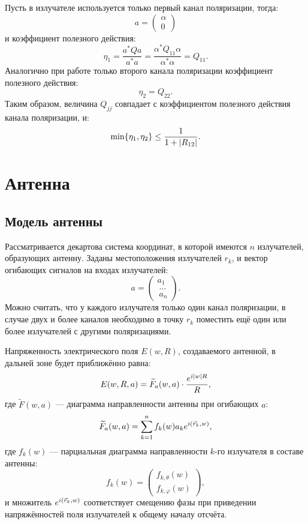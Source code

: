 Пусть в излучателе используется только первый канал поляризации, тогда:
\[
    a
    = \begin{pmatrix}
          \alpha \\
          0
    \end{pmatrix}
\]
и коэффициент полезного действия:
\[
    \eta_1
    = \frac{a^* Q a}{a^* a}
    = \frac{\alpha^* Q_{11} \alpha}{\alpha^* \alpha}
    = Q_{11}.
\]
Аналогично при работе только второго канала поляризации коэффициент полезного действия:
\[
    \eta_2 = Q_{22} .
\]
Таким образом, величина $Q_{jj}$ совпадает с коэффициентом полезного действия канала поляризации, и:
\[
    \min \{ \eta_1, \eta_2 \} \le \frac{1}{1 + \left | R_{12} \right |} .
\]


\section{Антенна}

\subsection{Модель антенны}

Рассматривается декартова система координат, в которой имеются $n$ излучателей, образующих антенну. Заданы местоположения излучателей $r_k$, и вектор огибающих
сигналов на входах излучателей:
\[
    a
    = \begin{pmatrix}
          a_1   \\\
          \dots \\\
          a_n
    \end{pmatrix} .
\]
Можно считать, что у каждого излучателя только один канал поляризации, в случае двух и более каналов необходимо в точку $r_k$ поместить ещё один или более
излучателей с другими поляризациями.

Напряженность электрического поля $E(w,R)$, создаваемого антенной, в дальней зоне будет приближённо равна:
\[
    E(w,R,a) = \widetilde{F}_a(w,a) \cdot \frac{e^{i \left | w \right | R}}{R} ,
\]
где $\widetilde{F}(w,a)$ --- диаграмма направленности антенны при огибающих $a$:
\[
    \widetilde{F}_a(w,a) = \sum_{k=1}^n f_k(w) a_k e^{i \left ( \vec{r}_k, w \right )} ,
\]
где $f_k(w)$ --- парциальная диаграмма направленности $k$-го излучателя в составе антенны:
\[
    f_k(w) =
    \begin{pmatrix}
        f_{k,\theta}(w) \\
        f_{k,\varphi}(w)
    \end{pmatrix}
    ,
\]
и множитель $e^{i \left ( \vec{r}_k, w \right )}$ соответствует смещению фазы при приведении напряжённостей поля излучателей к общему началу отсчёта.

